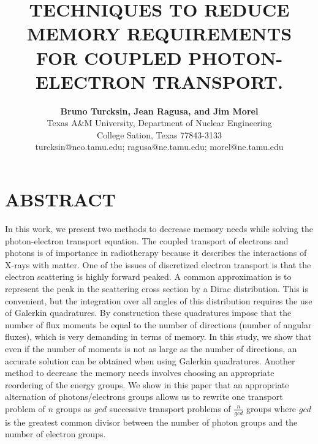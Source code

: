 \documentclass[11pt,letter,twoside]{mc2011}
\begin{document}
\title{TECHNIQUES TO REDUCE MEMORY REQUIREMENTS FOR COUPLED PHOTON-ELECTRON TRANSPORT.}

\author{
    \textbf{Bruno Turcksin, Jean Ragusa, and Jim Morel}\\
    Texas A\&M University, Department of Nuclear Engineering\\
    College Sation, Texas 77843-3133\\
    turcksin@neo.tamu.edu; ragusa@ne.tamu.edu; morel@ne.tamu.edu
}

\maketitle

\thispagestyle{empty}

\section*{ABSTRACT}

\small
 In this work, we present two methods to decrease memory needs while solving 
the photon-electron transport equation. The coupled transport of electrons and
photons is of importance in radiotherapy because it describes the interactions of
X-rays with matter. One of the issues of discretized electron transport is that the
electron scattering is highly forward peaked. A common approximation is to
represent the peak in the scattering cross section by a Dirac distribution.
This is convenient, but the integration over all angles of this distribution requires the
use of Galerkin quadratures. By construction these quadratures impose that
the number of flux moments be equal to the number of directions 
(number of angular fluxes), which is very demanding in terms of memory. In this study, 
we show that even if the number of moments is not as large as the number 
of directions, an accurate solution can be obtained when using Galerkin
quadratures. Another method to decrease the 
memory needs involves choosing an appropriate reordering of the energy
groups. 
We show in this paper that an appropriate alternation of photons/electrons groups 
allows us to rewrite one transport problem of $n$ groups as $gcd$ successive 
transport problems of $\frac{n}{gcd}$ groups where $gcd$ is the greatest common 
divisor between the number of photon groups and the number of electron groups.
\end{document}
